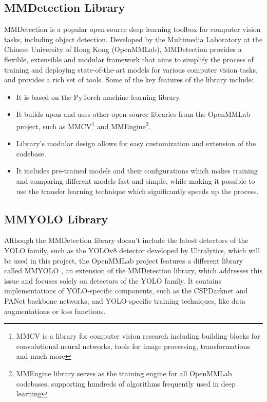 \subsection{MMDetection Library}

MMDetection \cite{MMDetection} is a popular open-source deep learning toolbox for
computer vision tasks, including object detection. Developed by the Multimedia
Laboratory at the Chinese University of Hong Kong  (OpenMMLab),
MMDetection provides a flexible, extensible and modular framework that aims to
simplify the process of training and deploying state-of-the-art models for
various computer vision tasks, and provides a rich set of tools. Some of the
key features of the library include:

\begin{itemize}
    \item It is based on the PyTorch machine learning library.
    \item It builds upon and uses other open-source libraries from the OpenMMLab
    project, such as MMCV\footnote{MMCV is a library for computer vision
    research including building blocks for convolutional neural networks, tools
    for image processing, transformations and much more} and
    MMEngine\footnote{MMEngine library serves as the training engine for all
    OpenMMLab codebases, supporting hundreds of algorithms frequently used in
    deep learning}.
    \item Library's modular design allows for easy customization and extension
    of the codebase.
    \item It includes pre-trained models and their configurations which makes
    training and comparing different models fast and simple, while making it
    possible to use the transfer learning technique which significantly speeds up the
    process.
\end{itemize}


\subsection{MMYOLO Library}

Although the MMDetection library doesn't include the latest detectors of the
YOLO family, such as the YOLOv8 detector developed by Ultralytics, which will be
used in this project, the OpenMMLab project features a different library called
MMYOLO \cite{MMYOLO}, an extension of the MMDetection library, which addresses
this issue and focuses solely on detectors of the YOLO family. It contains
implementations of YOLO-specific components, such as the CSPDarknet and PANet
backbone networks, and YOLO-specific training techniques, like data
augmentations or loss functions.


